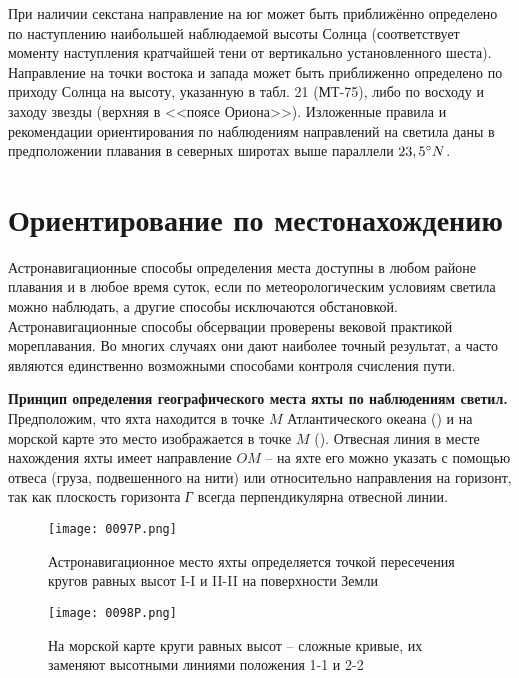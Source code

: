 При наличии секстана направление на юг может быть приближённо
определено по наступлению наибольшей наблюдаемой высоты Солнца
(соответствует моменту наступления кратчайшей тени от вертикально
установленного шеста). Направление на точки востока и запада может
быть приближенно определено по приходу Солнца на высоту, указанную в
табл. 21 (МТ-75), либо по восходу и заходу звезды 
(верхняя в <<поясе Ориона>>). Изложенные правила и рекомендации
ориентирования по наблюдениям направлений на светила даны в
предположении плавания в северных широтах выше параллели $23,5^\circ N$.

\section{Ориентирование по местонахождению\label{sec:7-5}}

Астронавигационные способы определения места доступны в любом районе
плавания и в любое время суток, если по метеорологическим условиям
светила можно наблюдать, а другие способы исключаются
обстановкой. Астронавигационные способы обсервации проверены вековой
практикой мореплавания. Во многих случаях они дают наиболее точный
результат, а часто являются единственно возможными способами контроля
счисления пути.

\textbf{Принцип определения географического места яхты по наблюдениям
  светил.}  Предположим, что яхта находится в точке $M$ Атлантического
океана () и на морской карте это место изображается в точке
$M$ ().  Отвесная линия в месте нахождения яхты имеет
направление $OM$ \--- на яхте его можно указать с помощью отвеса (груза,
подвешенного на нити) или относительно направления на горизонт, так
как плоскость горизонта \textit{Г} всегда перпендикулярна отвесной линии.

\begin{figure}[!htb]
  \centering
  \texttt{[image: 0097P.png]}
  \caption[Астронавигационное место яхты]{Астронавигационное место яхты определяется точкой пересечения кругов равных высот I-I и II-II на поверхности Земли}
  \label{fig:97}
\end{figure}

\begin{figure*}[!htb]
  \centering
  \texttt{[image: 0098P.png]}
  \caption[Круги равных высот на морской карте]{На морской карте круги равных высот \--- сложные кривые, их заменяют высотными линиями положения 1-1 и 2-2}
  \label{fig:98}
\end{figure*}

